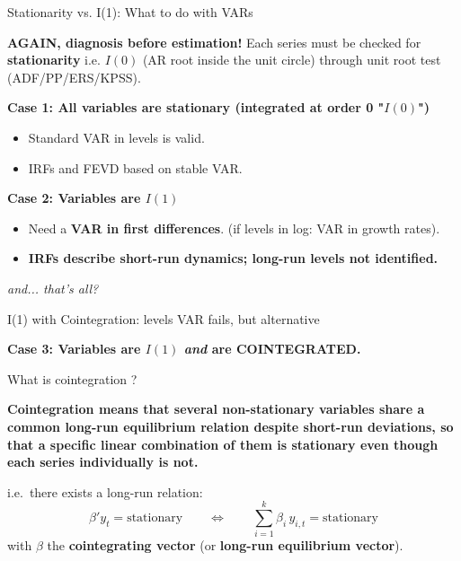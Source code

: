 \documentclass{beamer}
\begin{document}
\begin{frame}{Stationarity vs. I(1): What to do with VARs}

\textbf{AGAIN, diagnosis before estimation!}
Each series must be checked for \textbf{stationarity} i.e. $I(0)$ (AR root inside the unit circle) through unit root test (ADF/PP/ERS/KPSS). 

\bigskip

\textbf{Case 1: All variables are stationary (integrated at order 0 "$I(0)$")}
\begin{itemize}
    \item Standard VAR in levels is valid.
    \item IRFs and FEVD based on stable VAR.
\end{itemize}

\bigskip

\textbf{Case 2: Variables are $I(1)$}
\begin{itemize}
    \item Need a \textbf{VAR in first differences}. (if levels in log: VAR in growth rates). 
    \item \textbf{IRFs describe short-run dynamics; long-run levels not identified.}
\end{itemize}
\bigskip
\textit{and... that's all? }

\end{frame}


\begin{frame}{I(1) with Cointegration: levels VAR fails, but alternative}

\textbf{Case 3: Variables are $I(1)$ \textit{and} are COINTEGRATED.}

\smallskip
What is cointegration ? 
\pause
\smallskip
\begin{center}
\textbf{Cointegration means that several non-stationary variables share a common long-run equilibrium relation despite short-run deviations, so that a specific linear combination of them is stationary even though each series individually is not.}
\end{center}
\pause
i.e.\ there exists a long-run relation:
\[
\beta' y_t = \text{stationary}
\qquad\Longleftrightarrow\qquad
\sum_{i=1}^k \beta_i\, y_{i,t} = \text{stationary}
\]
with $\beta$ the \textbf{cointegrating vector} (or \textbf{long-run equilibrium vector}). 
\end{frame}
\end{document}
